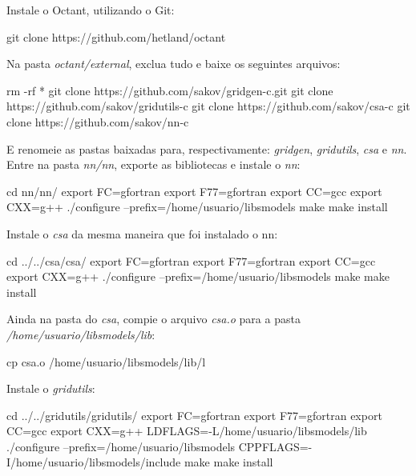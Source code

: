 \noindent Instale o Octant, utilizando o Git:
\bigskip

\begin{bashcode}
git clone https://github.com/hetland/octant
\end{bashcode}
\bigskip

\noindent Na pasta \textit{octant/external}, exclua tudo e baixe os seguintes arquivos:
\bigskip

\begin{bashcode}
rm -rf *
git clone https://github.com/sakov/gridgen-c.git
git clone https://github.com/sakov/gridutils-c
git clone https://github.com/sakov/csa-c
git clone https://github.com/sakov/nn-c
\end{bashcode}
\bigskip

\noindent E renomeie as pastas baixadas para, respectivamente: \textit{gridgen}, \textit{gridutils}, \textit{csa} e \textit{nn}. Entre na pasta \textit{nn/nn}, exporte as bibliotecas e instale o \textit{nn}:
\bigskip

\begin{bashcode}
cd nn/nn/
export FC=gfortran
export F77=gfortran
export CC=gcc
export CXX=g++
./configure --prefix=/home/usuario/libsmodels
make
make install
\end{bashcode}
\bigskip

\noindent Instale o \textit{csa} da mesma maneira que foi instalado o nn:
\bigskip

\begin{bashcode}
cd ../../csa/csa/
export FC=gfortran
export F77=gfortran
export CC=gcc
export CXX=g++
./configure --prefix=/home/usuario/libsmodels
make
make install
\end{bashcode}
\bigskip

\noindent Ainda na pasta do \textit{csa}, compie o arquivo \textit{csa.o} para a pasta \textit{/home/usuario/libsmodels/lib}:
\bigskip

\begin{bashcode}
cp csa.o /home/usuario/libsmodels/lib/l
\end{bashcode}
\bigskip

\noindent Instale o \textit{gridutils}:
\bigskip

\begin{bashcode}[fontsize=\scriptsize]
cd ../../gridutils/gridutils/
export FC=gfortran
export F77=gfortran
export CC=gcc
export CXX=g++
LDFLAGS=-L/home/usuario/libsmodels/lib
./configure --prefix=/home/usuario/libsmodels CPPFLAGS=-I/home/usuario/libsmodels/include
make
make install
\end{bashcode}
\bigskip

